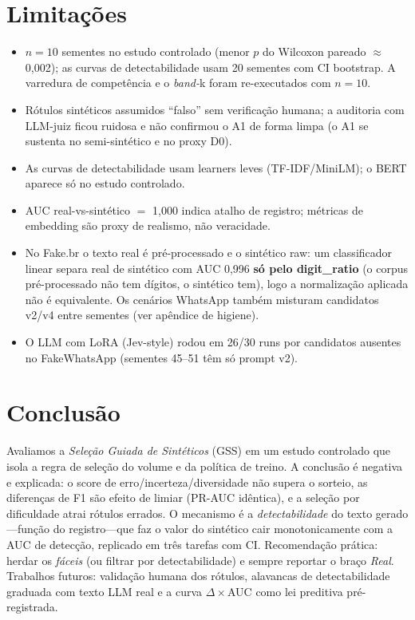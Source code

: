 \documentclass[conference]{IEEEtran}
\begin{document}
\section{Limita\c{c}\~oes}

\begin{itemize}
\item $n{=}10$ sementes no estudo controlado (menor $p$ do Wilcoxon pareado $\approx$0{,}002); as curvas de detectabilidade usam 20 sementes com CI bootstrap. A varredura de compet\^encia e o \emph{band-}k foram re-executados com $n{=}10$.
\item R\'otulos sint\'eticos assumidos ``falso'' sem verifica\c{c}\~ao humana; a auditoria com LLM-juiz ficou ruidosa e n\~ao confirmou o A1 de forma limpa (o A1 se sustenta no semi-sint\'etico e no proxy D0).
\item As curvas de detectabilidade usam learners leves (TF-IDF/MiniLM); o BERT aparece s\'o no estudo controlado.
\item AUC real-vs-sint\'etico $=$ 1{,}000 indica atalho de registro; m\'etricas de embedding s\~ao proxy de realismo, n\~ao veracidade.
\item No Fake.br o texto real \'e pr\'e-processado e o sint\'etico raw: um classificador linear separa real de sint\'etico com AUC 0{,}996 \textbf{s\'o pelo digit\_ratio} (o corpus pr\'e-processado n\~ao tem d\'igitos, o sint\'etico tem), logo a normaliza\c{c}\~ao aplicada n\~ao \'e equivalente. Os cen\'arios WhatsApp tamb\'em misturam candidatos v2/v4 entre sementes (ver ap\^endice de higiene).
\item O LLM com LoRA (Jev-style) rodou em 26/30 runs por candidatos ausentes no FakeWhatsApp (sementes 45--51 t\^em s\'o prompt v2).
\end{itemize}

\section{Conclus\~ao}

Avaliamos a \emph{Sele\c{c}\~ao Guiada de Sint\'eticos} (GSS) em um estudo controlado que isola a regra de sele\c{c}\~ao do volume e da pol\'itica de treino. A conclus\~ao \'e negativa e explicada: o score de erro/incerteza/diversidade n\~ao supera o sorteio, as diferen\c{c}as de F1 s\~ao efeito de limiar (PR-AUC id\^entica), e a sele\c{c}\~ao por dificuldade atrai r\'otulos errados. O mecanismo \'e a \emph{detectabilidade} do texto gerado---fun\c{c}\~ao do registro---que faz o valor do sint\'etico cair monotonicamente com a AUC de detec\c{c}\~ao, replicado em tr\^es tarefas com CI. Recomenda\c{c}\~ao pr\'atica: herdar os \emph{f\'aceis} (ou filtrar por detectabilidade) e sempre reportar o bra\c{c}o \emph{Real}. Trabalhos futuros: valida\c{c}\~ao humana dos r\'otulos, alavancas de detectabilidade graduada com texto LLM real e a curva $\Delta\times$AUC como lei preditiva pr\'e-registrada.
\end{document}
